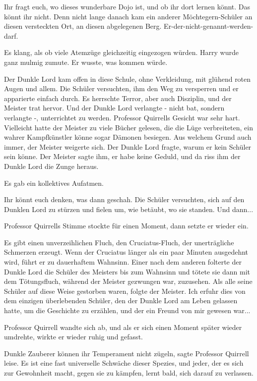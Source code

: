 \glqq{}Ihr fragt euch, wo dieses wunderbare Dojo ist, und ob ihr dort lernen
könnt. Das könnt ihr nicht. Denn nicht lange danach kam ein anderer
Möchtegern-Schüler an diesen versteckten Ort, an diesen abgelegenen Berg.
Er-der-nicht-genannt-werden-darf.\grqq{}

Es klang, als ob viele Atemzüge gleichzeitig eingezogen würden. Harry wurde ganz
mulmig zumute. Er wusste, was kommen würde.

\glqq{}Der Dunkle Lord kam offen in diese Schule, ohne Verkleidung, mit glühend
roten Augen und allem. Die Schüler versuchten, ihm den Weg zu versperren und er
apparierte einfach durch. Es herrschte Terror, aber auch Disziplin, und der
Meister trat hervor. Und der Dunkle Lord verlangte - nicht bat, sondern
verlangte -, unterrichtet zu werden.\grqq{} Professor Quirrells Gesicht war sehr
hart. \glqq{}Vielleicht hatte der Meister zu viele Bücher gelesen, die die Lüge
verbreiteten, ein wahrer Kampfkünstler könne sogar Dämonen besiegen. Aus welchem
Grund auch immer, der Meister weigerte sich. Der Dunkle Lord fragte, warum er
kein Schüler sein könne. Der Meister sagte ihm, er habe keine Geduld, und da
riss ihm der Dunkle Lord die Zunge heraus.\grqq{}

Es gab ein kollektives Aufatmen.

\glqq{}Ihr könnt euch denken, was dann geschah. Die Schüler versuchten, sich auf
den Dunklen Lord zu stürzen und fielen um, wie betäubt, wo sie standen. Und
dann...\grqq{}

Professor Quirrells Stimme stockte für einen Moment, dann setzte er wieder ein.

\glqq{}Es gibt einen unverzeihlichen Fluch, den Cruciatus-Fluch, der
unerträgliche Schmerzen erzeugt. Wenn der Cruciatus länger als ein paar Minuten
ausgedehnt wird, führt er zu dauerhaftem Wahnsinn. Einer nach dem anderen
folterte der Dunkle Lord die Schüler des Meisters bis zum Wahnsinn und tötete
sie dann mit dem Tötungsfluch, während der Meister gezwungen war, zuzusehen. Als
alle seine Schüler auf diese Weise gestorben waren, folgte der Meister. Ich
erfuhr dies von dem einzigen überlebenden Schüler, den der Dunkle Lord am Leben
gelassen hatte, um die Geschichte zu erzählen, und der ein Freund von mir
gewesen war...\grqq{}

Professor Quirrell wandte sich ab, und als er sich einen Moment später wieder
umdrehte, wirkte er wieder ruhig und gefasst.

\glqq{}Dunkle Zauberer können ihr Temperament nicht zügeln\grqq{}, sagte
Professor Quirrell leise. \glqq{}Es ist eine fast universelle Schwäche dieser
Spezies, und jeder, der es sich zur Gewohnheit macht, gegen sie zu kämpfen,
lernt bald, sich darauf zu verlassen.

